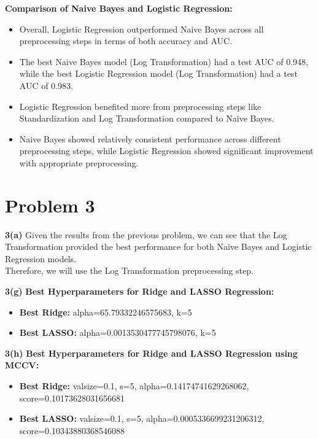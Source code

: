 \documentclass[10pt,letterpaper]{article}
\begin{document}
                \textbf{Comparison of Naive Bayes and Logistic Regression:}
                \begin{itemize}
                    \item Overall, Logistic Regression outperformed Naive Bayes across all preprocessing steps in terms of both accuracy and AUC.
                    \item The best Naive Bayes model (Log Transformation) had a test AUC of 0.948, while the best Logistic Regression model (Log Transformation) had a test AUC of 0.983.
                    \item Logistic Regression benefited more from preprocessing steps like Standardization and Log Transformation compared to Naive Bayes.
                    \item Naive Bayes showed relatively consistent performance across different preprocessing steps, while Logistic Regression showed significant improvement with appropriate preprocessing.
                \end{itemize}
        
    \section{Problem 3}
        
            \textbf{3(a)}
                Given the results from the previous problem, we can see that the Log Transformation provided the best performance for both Naive Bayes and Logistic Regression models.\\
                Therefore, we will use the Log Transformation preprocessing step.\\
                \par
            \textbf{3(g)}
                \textbf{Best Hyperparameters for Ridge and LASSO Regression:}
                \begin{itemize}
                    \item \textbf{Best Ridge:} alpha=65.79332246575683, k=5
                    \item \textbf{Best LASSO:} alpha=0.0013530477745798076, k=5\\
                \end{itemize}
            \textbf{3(h)}
                \textbf{Best Hyperparameters for Ridge and LASSO Regression using MCCV:}
                \begin{itemize}
                    \item \textbf{Best Ridge:} valsize=0.1, s=5, alpha=0.14174741629268062, score=0.10173628031656681
                    \item \textbf{Best LASSO:} valsize=0.1, s=5, alpha=0.0005336699231206312, score=0.10343880368546088\\
                \end{itemize}
                
\end{document}
